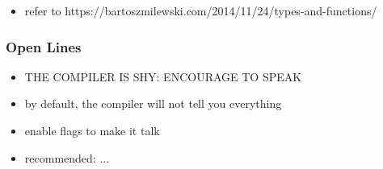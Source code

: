 \documentclass{beamer}
\begin{document}
\begin{frame}
  \begin{itemize}
  \item refer to https://bartoszmilewski.com/2014/11/24/types-and-functions/
  \end{itemize}


  
  
  
  
  
  
  
  
  
  
  
  
  
  



\end{frame}

\begin{frame}
  \frametitle{Open Lines}
  \begin{itemize}
  \item THE COMPILER IS SHY: ENCOURAGE TO SPEAK
  \item by default, the compiler will not tell you everything
  \item enable flags to make it talk
  \item recommended: ...
  \end{itemize}
\end{frame}
\end{document}
